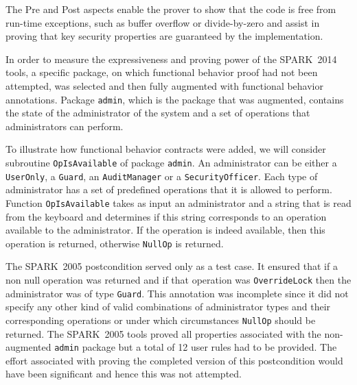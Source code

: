 \documentclass[10pt,a4paper,twocolumn]{article}
\newcommand{\oldspark}{SPARK~2005\xspace}
\newcommand{\newspark}{SPARK~2014\xspace}
\newcommand{\eg}{\textit{e.g.}\xspace}
\begin{document}
The Pre and Post aspects enable the prover to show that the code is
free from run-time exceptions, such as buffer overflow or
divide-by-zero and assist in proving that key security properties are
guaranteed by the implementation.

In order to measure the expressiveness and proving power of the
\newspark tools, a specific package, on which functional behavior
proof had not been attempted, was selected and then fully augmented
with functional behavior annotations. Package \verb|admin|, which is
the package that was augmented, contains the state of the
administrator of the system and a set of operations that
administrators can perform.

To illustrate how functional behavior contracts were added, we will
consider subroutine \verb|OpIsAvailable| of package \verb|admin|. An
administrator can be either a \verb|UserOnly|, a \verb|Guard|, an
\verb|AuditManager| or a \verb|SecurityOfficer|. Each type of
administrator has a set of predefined operations that it is allowed to
perform. Function \verb|OpIsAvailable| takes as input an administrator
and a string that is read from the keyboard and determines if this
string corresponds to an operation available to the administrator. If
the operation is indeed available, then this operation is returned,
otherwise \verb|NullOp| is returned.

The \oldspark postcondition served only as a test case. It ensured
that if a non null operation was returned and if that operation was
\verb|OverrideLock| then the administrator was of type
\verb|Guard|. This annotation was incomplete since it did not specify
any other kind of valid combinations of administrator types and their
corresponding operations
or under which circumstances \verb|NullOp| should be returned.  The
\oldspark tools proved all properties associated with the
non-augmented \verb|admin| package but a total of 12 user rules had to
be provided. The effort associated with proving the completed version
of this postcondition would have been significant and hence this was
not attempted.
\end{document}
